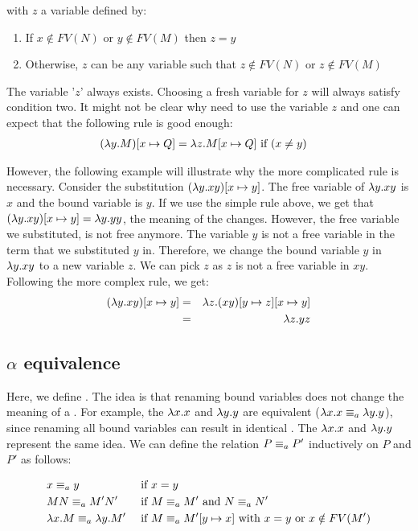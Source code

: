 with $z$ a variable defined by:
\begin{enumerate}
	\item%
	If $x \notin FV(N)$ or $y \notin FV(M)$ then $z = y$
	\item%
	Otherwise, $z$ can be any variable such that $z \notin FV(N)$ or $z \notin FV(M)$
\end{enumerate}

The variable '$z$' always exists. Choosing a fresh variable for $z$ will always satisfy condition two.
It might not be clear why need to use the variable $z$ and one can expect that the following rule is good enough:
\begin{align*}
	(\lambda {y}.{M}) [{x}\mapsto{Q}] &= \lambda {z}.{M [{x}\mapsto{Q}]} \text{ if } (x \neq y)
\end{align*}

However, the following example will illustrate why the more complicated rule is necessary.
Consider the substitution $(\lambda {y}.{xy})[{x}\mapsto{y}]$. The free variable of \lterm $\lambda {y}.{xy}$ is $x$ and the bound variable is $y$.
If we use the simple rule above, we get that $(\lambda {y}.{xy})[{x}\mapsto{y}] = \lambda {y}.{yy}$, the meaning of the \lterm changes. 
However, the free variable we substituted, is not free anymore. The variable $y$ is not a free variable in the term that we substituted $y$ in.
Therefore, we change the bound variable $y$ in $\lambda {y}.{xy}$ to a new variable $z$. We can pick $z$ as $z$ is not a free variable in $xy$.
Following the more complex rule, we get: 
\begin{eqnarray*}
	(\lambda {y}.{xy})[{x}\mapsto{y}] &=& \lambda {z}.{(xy)[{y}\mapsto{z}][{x}\mapsto{y}]} \\
	&=& \lambda {z}.{yz}
\end{eqnarray*}

\subsection{\texorpdfstring{\boldmath${\alpha}$ equivalence}{Alpha equivalence}}
Here, we define \aeq. The idea is that renaming bound variables does not change the meaning of a \lterm.
For example, the \lterms $\lambda {x}.{x}$ and $\lambda {y}.{y}$ are equivalent ($\lambda {x}.{x} \equiv_a \lambda {y}.{y}$), since renaming all bound variables can result in identical \lterms.
The \lterms $\lambda {x}.{x}$ and $\lambda {y}.{y}$ represent the same idea.
We can define the relation $P \equiv_a P'$ inductively on $P$ and $P'$ as follows:

\[
\begin{aligned}
	& x \equiv_a y                      & &  \text{ if } x = y \\
	& MN \equiv_a M'N'                  & & \text{ if } M \equiv_a M' \text{ and } N \equiv_a N' \\
	& \lambda {x}.{M} \equiv_a \lambda {y}.{M'} & & \text{ if } M \equiv_a M'[{y}\mapsto{x}] \text{ with } x = y \text{ or } x \notin FV(M') \\
\end{aligned}
\]

